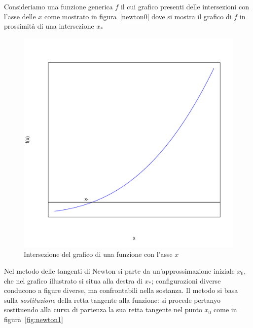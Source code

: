 \documentclass[onecolumn,11pt]{book}\usepackage[]{graphicx}\usepackage[]{color}
\makeatletter
\def\maxwidth{ %
  \ifdim\Gin@nat@width>\linewidth
    \linewidth
  \else
    \Gin@nat@width
  \fi
}
\newenvironment{knitrout}{}{} %
\makeatother
\begin{document}
Consideriamo una funzione generica $f$ il cui grafico presenti delle intersezioni con l'asse delle $x$ come mostrato in figura~\ref{newton0}
dove si mostra il grafico di $f$ in prossimit\`a di una intersezione $x_*$
\begin{figure}
\begin{center}
\begin{knitrout}
\color{fgcolor}
\includegraphics[width=\maxwidth]{figure/unnamed-chunk-132-1} 

\end{knitrout}
\caption{Intersezione del grafico di una funzione con l'asse $x$}
\label{fig:newton0}
\end{center}\end{figure}
Nel metodo delle tangenti di Newton si parte da un'approssimazione iniziale $x_0$, che nel grafico illustrato si situa alla destra di $x_*$;
configurazioni diverse conducono a figure diverse, ma confrontabili nella sostanza.
Il metodo si basa sulla \emph{sostituzione} della retta tangente alla funzione:
si procede  pertanyo  sostituendo alla curva di partenza la sua retta tangente nel punto $x_0$ come in figura~\ref{fig:newton1}
\end{document}
